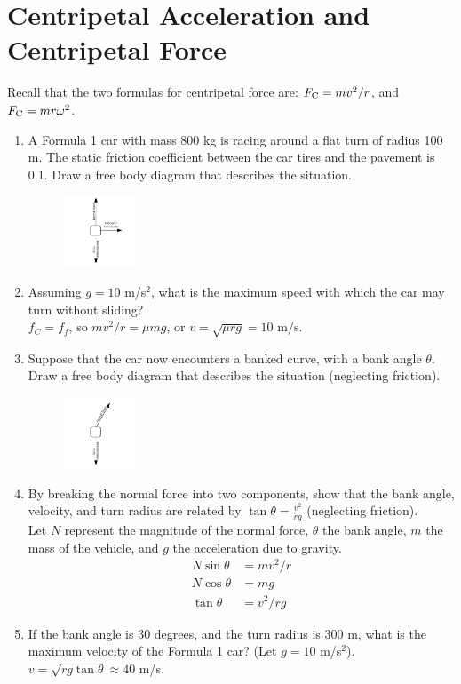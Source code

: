 \documentclass[10pt]{article}
\begin{document}
\section{Centripetal Acceleration and Centripetal Force}
Recall that the two formulas for centripetal force are: $F_{\rm C} = mv^2/r$, and $F_{\rm C} = mr\omega^2$.
\begin{enumerate}
\item A Formula 1 car with mass 800 kg is racing around a flat turn of radius 100 m.  The static friction coefficient between the car tires and the pavement is 0.1.  Draw a free body diagram that describes the situation. \\
\begin{figure}[ht]
\centering
\includegraphics[width=0.2\textwidth]{figures/Friction1.pdf}
\end{figure}
\item Assuming $g = 10$ m/s$^2$, what is the maximum speed with which the car may turn without sliding? \\
$f_C = f_f$, so $mv^2/r = \mu m g$, or $v = \sqrt{\mu rg} = 10$ m/s.
\item Suppose that the car now encounters a banked curve, with a bank angle $\theta$.  Draw a free body diagram that describes the situation (neglecting friction). \\
\begin{figure}
\centering
\includegraphics[width=0.2\textwidth]{figures/Bank1.pdf}
\end{figure}
\item By breaking the normal force into two components, show that the bank angle, velocity, and turn radius are related by $\tan\theta = \frac{v^2}{rg}$ (neglecting friction). \\
Let $N$ represent the magnitude of the normal force, $\theta$ the bank angle, $m$ the mass of the vehicle, and $g$ the acceleration due to gravity.
\begin{align}
N\sin\theta &= mv^2/r \\
N\cos\theta &= mg \\
\tan\theta &= v^2/rg
\end{align}
\item If the bank angle is 30 degrees, and the turn radius is 300 m, what is the maximum velocity of the Formula 1 car?  (Let $g = 10$ m/s$^2$). \\
$v = \sqrt{rg\tan\theta} \approx 40$ m/s.
\end{enumerate}
\end{document}
